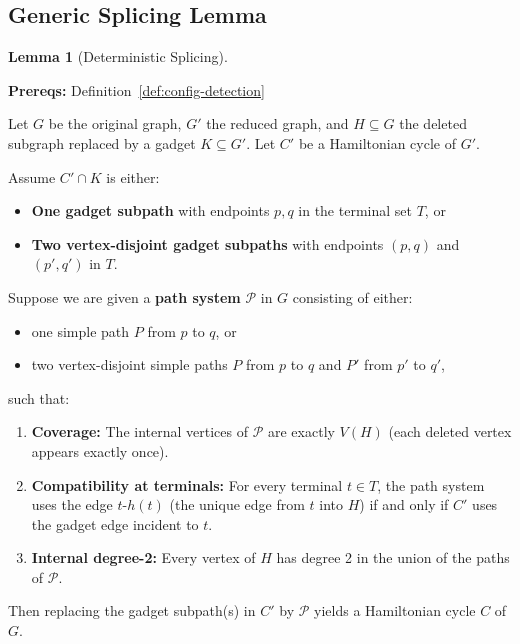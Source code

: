 \documentclass[12pt]{article}
\theoremstyle{definition}
\newtheorem{lemma}[theorem]{Lemma}
\newcommand{\prereq}[1]{\par\noindent\textbf{Prereqs:} #1\par}
\begin{document}
\subsection{Generic Splicing Lemma}
\label{subsec:splicing-lemma}

\begin{lemma}[Deterministic Splicing]
\label{lem:splicing}
\prereq{Definition~\ref{def:config-detection}}
Let $G$ be the original graph, $G'$ the reduced graph, and $H \subseteq G$ the deleted subgraph replaced by a gadget $K \subseteq G'$. Let $C'$ be a Hamiltonian cycle of $G'$.

Assume $C' \cap K$ is either:
\begin{itemize}
    \item \textbf{One gadget subpath} with endpoints $p,q$ in the terminal set $T$, or
    \item \textbf{Two vertex-disjoint gadget subpaths} with endpoints $(p,q)$ and $(p',q')$ in $T$.
\end{itemize}

Suppose we are given a \textbf{path system} $\mathcal{P}$ in $G$ consisting of either:
\begin{itemize}
    \item one simple path $P$ from $p$ to $q$, or
    \item two vertex-disjoint simple paths $P$ from $p$ to $q$ and $P'$ from $p'$ to $q'$,
\end{itemize}
such that:
\begin{enumerate}
    \item \textbf{Coverage:} The internal vertices of $\mathcal{P}$ are exactly $V(H)$ (each deleted vertex appears exactly once).
    \item \textbf{Compatibility at terminals:} For every terminal $t \in T$, the path system uses the edge $t$-$h(t)$ (the unique edge from $t$ into $H$) if and only if $C'$ uses the gadget edge incident to $t$.
    \item \textbf{Internal degree-2:} Every vertex of $H$ has degree 2 in the union of the paths of $\mathcal{P}$.
\end{enumerate}
Then replacing the gadget subpath(s) in $C'$ by $\mathcal{P}$ yields a Hamiltonian cycle $C$ of $G$.
\end{lemma}
\end{document}
